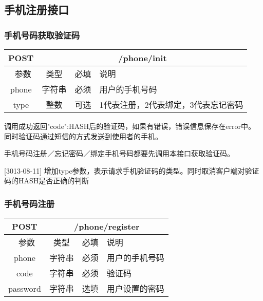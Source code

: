\subsection{手机注册接口}

\subsubsection{手机号码获取验证码}
\label{hash_algorithm}

\begin{table}[H]
   \begin{center}
\begin{tabular}{|c|c|c|p{12cm}|}
\hline
POST & \multicolumn{3}{|c|}{/phone/init} \\
\hline\hline
 \  参数  & 类型 & 必填 &  说明  \\
\hline
 phone  & 字符串 & 必须 &  用户的手机号码\\
\hline
 type  & 整数 & 可选 &  1代表注册，2代表绑定，3代表忘记密码\\
\hline
\end{tabular}
   \end{center}
\end{table}

调用成功返回{"code":HASH后的验证码}，如果有错误，错误信息保存在error中。
同时验证码通过短信的方式发送到使用者的手机。

手机号码注册／忘记密码／绑定手机号码都要先调用本接口获取验证码。

[3013-08-11] 增加type参数，表示请求手机验证码的类型。同时取消客户端对验证码的HASH是否正确的判断

\subsubsection{手机号码注册}
\label{hash_algorithm}

\begin{table}[H]
   \begin{center}
\begin{tabular}{|c|c|c|p{12cm}|}
\hline
POST & \multicolumn{3}{|c|}{/phone/register} \\
\hline\hline
 \  参数  & 类型 & 必填 &  说明  \\
\hline
 phone  & 字符串 & 必须 &  用户的手机号码\\
\hline
 code  & 字符串 & 必须 &  验证码\\
\hline
 password  & 字符串 & 选填 &  用户设置的密码\\
\hline
\end{tabular}
   \end{center}
\end{table}

